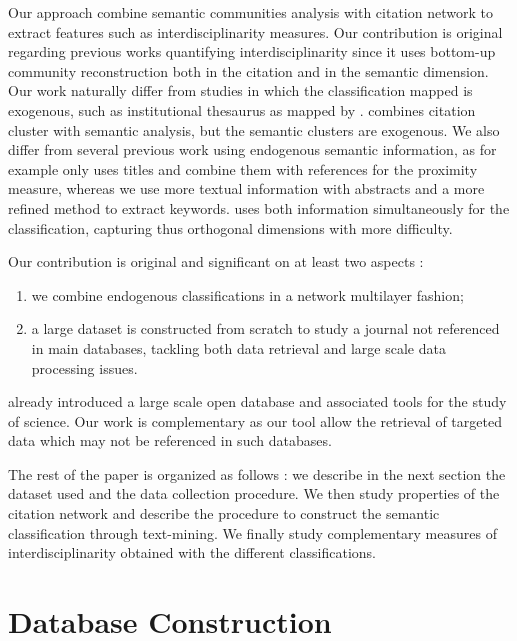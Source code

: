 Our approach combine semantic communities analysis with citation network to extract features such as interdisciplinarity measures. Our contribution is original regarding previous works quantifying interdisciplinarity since it uses bottom-up community reconstruction both in the citation and in the semantic dimension. Our work naturally differ from studies in which the classification mapped is exogenous, such as institutional thesaurus as mapped by \cite{boyack2017thesaurus}. \cite{zhang2010journal} combines citation cluster with semantic analysis, but the semantic clusters are exogenous. We also differ from several previous work using endogenous semantic information, as \cite{vugteveen2014dynamics} for example only uses titles and combine them with references for the proximity measure, whereas we use more textual information with abstracts and a more refined method to extract keywords. \cite{bouveyron2016stochastic} uses both information simultaneously for the classification, capturing thus orthogonal dimensions with more difficulty.



Our contribution is original and significant on at least two aspects :
\begin{enumerate}
	\item we combine endogenous classifications in a network multilayer fashion;
	\item a large dataset is constructed from scratch to study a journal not referenced in main databases, tackling both data retrieval and large scale data processing issues.
\end{enumerate}

\cite{light2014open} already introduced a large scale open database and associated tools for the study of science. Our work is complementary as our tool allow the retrieval of targeted data which may not be referenced in such databases.

The rest of the paper is organized as follows : we describe in the next section the dataset used and the data collection procedure. We then study properties of the citation network and describe the procedure to construct the semantic classification through text-mining. We finally study complementary measures of interdisciplinarity obtained with the different classifications.




\section*{Database Construction}
\label{sec:data}



